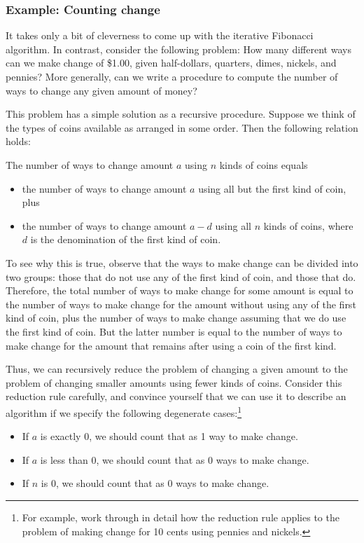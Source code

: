 \subsubsection*{Example: Counting change}

It takes only a bit of cleverness to come up with the iterative
Fibonacci algorithm.  In contrast, consider the following problem: How
many different ways can we make change of \$1.00, given half-dollars,
quarters, dimes, nickels, and pennies?  More generally, can we write a
procedure to compute the number of ways to change any given amount of
money?

This problem has a simple solution as a recursive procedure.  Suppose
we think of the types of coins available as arranged in some order.
Then the following relation holds:

The number of ways to change amount $a$ using $n$ kinds of coins equals

\begin{itemize}
\item the number of ways to change amount $a$ using all but the first
  kind of coin, plus

\item the number of ways to change amount $a - d$ using all $n$ kinds
  of coins, where $d$ is the denomination of the first kind of coin.
\end{itemize}

To see why this is true, observe that the ways to make change can be
divided into two groups: those that do not use any of the first kind
of coin, and those that do.  Therefore, the total number of ways to
make change for some amount is equal to the number of ways to make
change for the amount without using any of the first kind of coin,
plus the number of ways to make change assuming that we do use the
first kind of coin.  But the latter number is equal to the number of
ways to make change for the amount that remains after using a coin of
the first kind.

Thus, we can recursively reduce the problem of changing a given amount
to the problem of changing smaller amounts using fewer kinds of coins.
Consider this reduction rule carefully, and convince yourself that we
can use it to describe an algorithm if we specify the following
degenerate cases:\footnote{For example, work through in detail how the
  reduction rule applies to the problem of making change for 10 cents
  using pennies and nickels.}

\begin{itemize}
\item If $a$ is exactly 0, we should count that as 1 way to make change.

\item If $a$ is less than 0, we should count that as 0 ways to make change.

\item If $n$ is 0, we should count that as 0 ways to make change.
\end{itemize}

